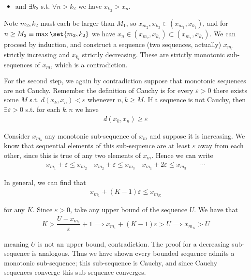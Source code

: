 \documentclass{article}
\begin{document}
\begin{enumerate}[1.]
\begin{itemize}[label=$\bullet$]
      \item and $\exists k_2$ s.t. $\forall n > k_2$ we have $x_{k_2} > x_n$.
    \end{itemize}

    Note $m_2, k_2$ must each be larger than $M_1$, so $x_{m_2}, x_{k_2} \in (x_{m_1}, x_{k_1})$, and for $n \ge M_2 \equiv \max\set{m_2, k_2}$ we have $x_n \in (x_{m_2}, x_{k_2}) \subset (x_{m_1}, x_{k_1})$. We can proceed by induction, and construct a sequence (two sequences, actually) $x_{m_l}$ strictly increasing and $x_{k_l}$ strictly decreasing. These are strictly monotonic sub-sequences of $x_m$, which is a contradiction.

    For the second step, we again by contradiction suppose that monotonic sequences are not Cauchy. Remember the definition of Cauchy is for every $\varepsilon > 0$ there exists some $M$ s.t. $d(x_k, x_n) < \varepsilon$ whenever $n, k \ge M$. If a sequence is not Cauchy, then $\exists \varepsilon > 0$ s.t. for each $k, n$ we have
    \begin{align*}
      d(x_k, x_n) \ge \varepsilon
    \end{align*}

    Consider $x_{m_k}$ any monotonic sub-sequence of $x_m$ and suppose it is increasing. We know that sequential elements of this sub-sequence are at least $\varepsilon$ away from each other, since this is true of any two elements of $x_m$. Hence we can write
    \begin{align*}
      x_{m_1} + \varepsilon
      \le
      x_{m_2}
      \quad
      x_{m_2} + \varepsilon
      \le
      x_{m_3}
      \quad
      x_{m_1} + 2\varepsilon
      \le
      x_{m_3}
      \quad
      \quad
      \cdots
    \end{align*}

    In general, we can find that
    \begin{align*}
      x_{m_1} + (K - 1) \varepsilon \le x_{m_K}
    \end{align*}

    for any $K$. Since $\varepsilon > 0$, take any upper bound of the sequence $U$. We have that
    \begin{align*}
      K > \dfrac{U - x_{m_1}}{\varepsilon} + 1
      \implies
      x_{m_1} + (K - 1) \varepsilon > U
      \implies
      x_{m_K} > U
    \end{align*}

    meaning $U$ is not an upper bound, contradiction. The proof for a decreasing sub-sequence is analogous. Thus we have shown every bounded sequence admits a monotonic sub-sequence; this sub-sequence is Cauchy, and since Cauchy sequences converge this sub-sequence converges.


\end{enumerate}
\end{document}
